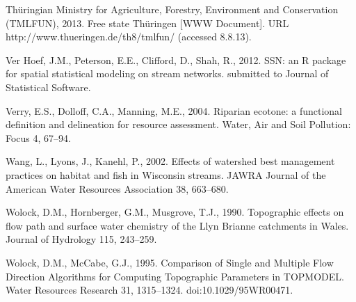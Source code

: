 \begin{thebibliography}
\bibitem{} \hangindent=1cm Thüringian Ministry for Agriculture, Forestry, Environment and Conservation (TMLFUN), 2013. Free state Thüringen [WWW Document]. URL http://www.thueringen.de/th8/tmlfun/ (accessed 8.8.13).

\bibitem{} \hangindent=1cm Ver Hoef, J.M., Peterson, E.E., Clifford, D., Shah, R., 2012. SSN: an R package for spatial statistical modeling on stream networks. submitted to Journal of Statistical Software.

\bibitem{} \hangindent=1cm Verry, E.S., Dolloff, C.A., Manning, M.E., 2004. Riparian ecotone: a functional definition and delineation for resource assessment. Water, Air and Soil Pollution: Focus 4, 67–94.

\bibitem{} \hangindent=1cm Wang, L., Lyons, J., Kanehl, P., 2002. Effects of watershed best management practices on habitat and fish in Wisconsin streams. JAWRA Journal of the American Water Resources Association 38, 663–680.

\bibitem{} \hangindent=1cm Wolock, D.M., Hornberger, G.M., Musgrove, T.J., 1990. Topographic effects on flow path and surface water chemistry of the Llyn Brianne catchments in Wales. Journal of Hydrology 115, 243–259.

\bibitem{} \hangindent=1cm Wolock, D.M., McCabe, G.J., 1995. Comparison of Single and Multiple Flow Direction Algorithms for Computing Topographic Parameters in TOPMODEL. Water Resources Research 31, 1315–1324. doi:10.1029/95WR00471.

\end{thebibliography}

\endgroup

\openright